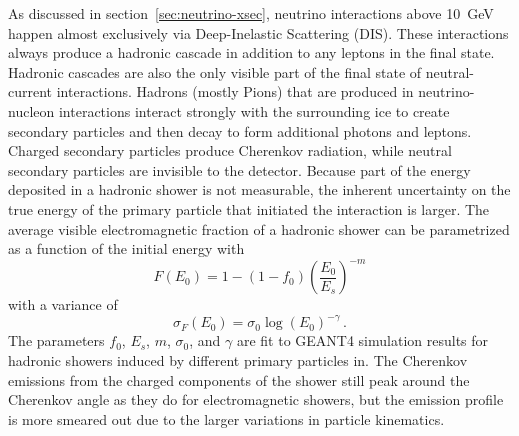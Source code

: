 As discussed in section~\ref{sec:neutrino-xsec}, neutrino interactions above 10~GeV happen almost exclusively via Deep-Inelastic Scattering (DIS). These interactions always produce a hadronic cascade in addition to any leptons in the final state. Hadronic cascades are also the only visible part of the final state of neutral-current interactions. Hadrons (mostly Pions) that are produced in neutrino-nucleon interactions interact strongly with the surrounding ice to create secondary particles and then decay to form additional photons and leptons. Charged secondary particles produce Cherenkov radiation, while neutral secondary particles are invisible to the detector. Because part of the energy deposited in a hadronic shower is not measurable, the inherent uncertainty on the true energy of the primary particle that initiated the interaction is larger. The average visible electromagnetic fraction of a hadronic shower can be parametrized\cite{RADEL2013102} as a function of the initial energy with 
\begin{equation}
    F(E_0) = 1 - (1-f_0)\left(\frac{E_0}{E_s}\right)^{-m}
\end{equation}
with a variance of 
\begin{equation}
    \sigma_F(E_0) = \sigma_0 \log(E_0)^{-\gamma}\,.
\end{equation}
The parameters $f_0$, $E_s$, $m$, $\sigma_0$, and $\gamma$ are fit to GEANT4 simulation results for hadronic showers induced by different primary particles in\cite{RADEL2013102}.
The Cherenkov emissions from the charged components of the shower still peak around the Cherenkov angle as they do for electromagnetic showers, but the emission profile is more smeared out due to the larger variations in particle kinematics.